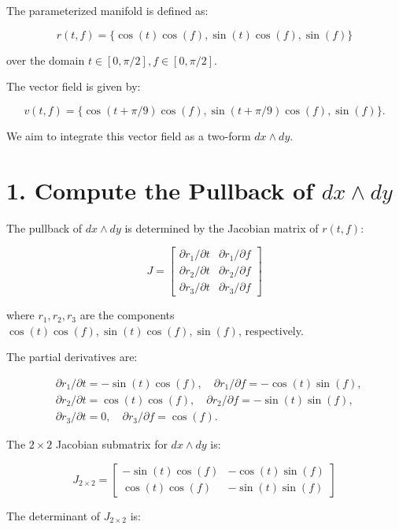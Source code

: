 \documentclass{article}
\begin{document}
	
	The parameterized manifold is defined as:
	
	\[
	r(t, f) = \{ \cos(t)\cos(f), \sin(t)\cos(f), \sin(f) \}
	\]
	
	over the domain \( t \in [0, \pi/2], f \in [0, \pi/2] \).
	
	The vector field is given by:
	
	\[
	v(t, f) = \{\cos(t + \pi/9)\cos(f), \sin(t + \pi/9)\cos(f), \sin(f) \}.
	\]
	
	We aim to integrate this vector field as a two-form \( dx \wedge dy \).
	
	\section*{1. Compute the Pullback of \( dx \wedge dy \)}
	The pullback of \( dx \wedge dy \) is determined by the Jacobian matrix of \( r(t, f) \):
	
	\[
	J = 
	\begin{bmatrix}
		\partial r_1 / \partial t & \partial r_1 / \partial f \\
		\partial r_2 / \partial t & \partial r_2 / \partial f \\
		\partial r_3 / \partial t & \partial r_3 / \partial f
	\end{bmatrix}
	\]
	
	where \( r_1, r_2, r_3 \) are the components \( \cos(t)\cos(f), \sin(t)\cos(f), \sin(f) \), respectively.
	
	The partial derivatives are:
	
	\[
	\begin{aligned}
		&\partial r_1 / \partial t = -\sin(t)\cos(f), \quad \partial r_1 / \partial f = -\cos(t)\sin(f), \\
		&\partial r_2 / \partial t = \cos(t)\cos(f), \quad \partial r_2 / \partial f = -\sin(t)\sin(f), \\
		&\partial r_3 / \partial t = 0, \quad \partial r_3 / \partial f = \cos(f).
	\end{aligned}
	\]
	
	The \( 2 \times 2 \) Jacobian submatrix for \( dx \wedge dy \) is:
	
	\[
	J_{2\times2} = 
	\begin{bmatrix}
		-\sin(t)\cos(f) & -\cos(t)\sin(f) \\
		\cos(t)\cos(f) & -\sin(t)\sin(f)
	\end{bmatrix}
	\]
	
	The determinant of \( J_{2\times2} \) is:
	
\end{document}
